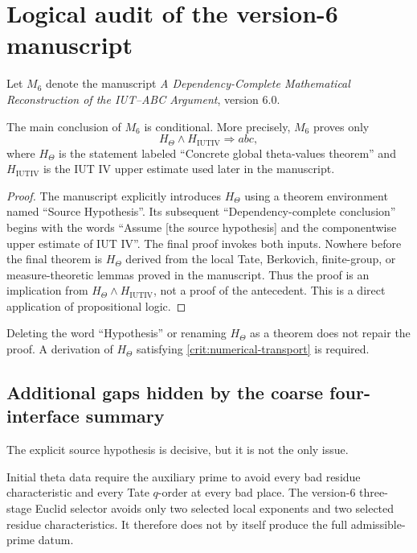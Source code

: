 \section{Logical audit of the version-6 manuscript}

Let $M_6$ denote the manuscript \emph{A Dependency-Complete Mathematical Reconstruction of the IUT--ABC Argument}, version 6.0.

\begin{theorem}\label{thm:conditionality}
The main conclusion of $M_6$ is conditional.  More precisely, $M_6$ proves only
\[
 H_{\Theta}\wedge H_{\mathrm{IUTIV}}\Longrightarrow abc,
\]
where $H_{\Theta}$ is the statement labeled ``Concrete global theta-values theorem'' and $H_{\mathrm{IUTIV}}$ is the IUT IV upper estimate used later in the manuscript.
\end{theorem}

\begin{proof}
The manuscript explicitly introduces $H_{\Theta}$ using a theorem environment named ``Source Hypothesis''.  Its subsequent ``Dependency-complete conclusion'' begins with the words ``Assume [the source hypothesis] and the componentwise upper estimate of IUT IV''.  The final proof invokes both inputs.  Nowhere before the final theorem is $H_{\Theta}$ derived from the local Tate, Berkovich, finite-group, or measure-theoretic lemmas proved in the manuscript.  Thus the proof is an implication from $H_{\Theta}\wedge H_{\mathrm{IUTIV}}$, not a proof of the antecedent.  This is a direct application of propositional logic.
\end{proof}

\begin{corollary}
Deleting the word ``Hypothesis'' or renaming $H_{\Theta}$ as a theorem does not repair the proof.  A derivation of $H_{\Theta}$ satisfying \cref{crit:numerical-transport} is required.
\end{corollary}

\subsection{Additional gaps hidden by the coarse four-interface summary}

The explicit source hypothesis is decisive, but it is not the only issue.

\begin{audit}
Initial theta data require the auxiliary prime to avoid every bad residue characteristic and every Tate $q$-order at every bad place.  The version-6 three-stage Euclid selector avoids only two selected local exponents and two selected residue characteristics.  It therefore does not by itself produce the full admissible-prime datum.
\end{audit}

